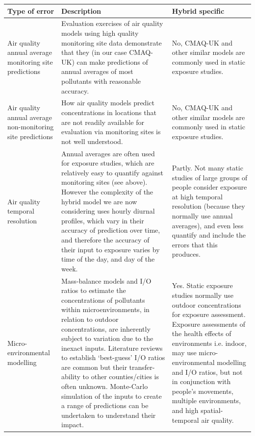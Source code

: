 \thispagestyle{empty}
\begin{landscape}

\begin{table}[ht]
\begin{tabular}{ | p{3.2cm} | p{13.2cm} | p{7.9cm} |}
\hline
\textbf{Type of error} & \textbf{Description} & \textbf{Hybrid specific} \\ \hline
        Air quality annual average monitoring site predictions  &  Evaluation exercises of air quality models using high quality monitoring site data demonstrate that they (in our case CMAQ-UK) can make predictions of annual averages of most pollutants with reasonable accuracy.         &  No, CMAQ-UK and other similar models are commonly used in static exposure studies.         \\ \hline
        
        Air quality annual average non-monitoring site predictions  &  How air quality models predict concentrations in locations that are not readily available for evaluation via monitoring sites is not well understood.         &   No, CMAQ-UK and other similar models are commonly used in static exposure studies.        \\ \hline
        
        Air quality temporal resolution  &  Annual averages are often used for exposure studies, which are relatively easy to quantify against monitoring sites (see above). However the complexity of the hybrid model we are now considering uses hourly diurnal profiles, which vary in their accuracy of prediction over time, and therefore the accuracy of their input to exposure varies by time of the day, and day of the week.         &   Partly. Not many static studies of large groups of people consider exposure at high temporal resolution (because they normally use annual averages), and even less quantify and include the errors that this produces.        \\ \hline
        
        Micro-environmental modelling  &   Mass-balance models and I/O ratios to estimate the concentrations of pollutants within microenvironments, in relation to outdoor concentrations, are inherently subject to variation due to the inexact inputs. Literature reviews to establish ‘best-guess’ I/O ratios are common but their transfer-ability to other counties/cities is often unknown. Monte-Carlo simulation of the inputs to create a range of predictions can be undertaken to understand their impact.         &    Yes. Static exposure studies normally use outdoor concentrations for exposure assessment. Exposure assessments of the health effects of environments i.e. indoor, may use micro-environmental modelling and I/O ratios, but not in conjunction with people’s movements, multiple environments, and high spatial-temporal air quality.       \\ \hline
        

\end{tabular}
\end{table}
\end{landscape}
